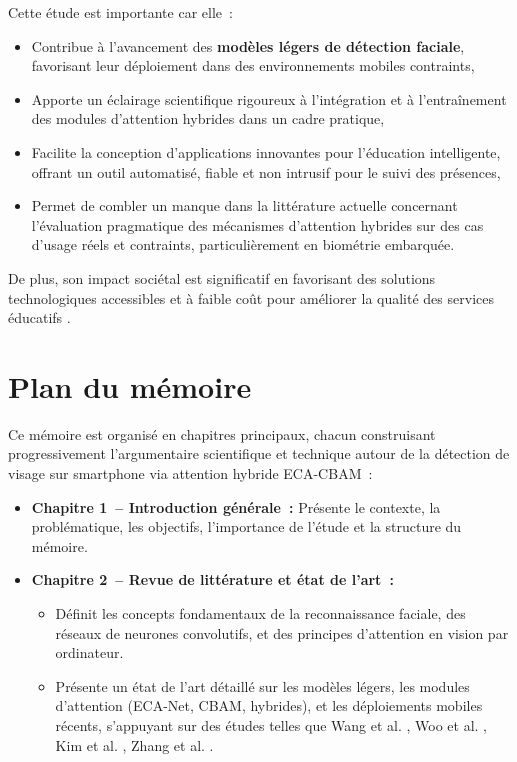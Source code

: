 \begin{onehalfspace}
\hspace{0.65 cm}Cette étude est importante car elle~:

\begin{itemize}
\item Contribue à l'avancement des \textbf{modèles légers de détection faciale}, favorisant leur déploiement dans des environnements mobiles contraints,
\item Apporte un éclairage scientifique rigoureux à l'intégration et à l'entraînement des modules d'attention hybrides dans un cadre pratique,
\item Facilite la conception d'applications innovantes pour l'éducation intelligente, offrant un outil automatisé, fiable et non intrusif pour le suivi des présences,
\item Permet de combler un manque dans la littérature actuelle concernant l'évaluation pragmatique des mécanismes d'attention hybrides sur des cas d'usage réels et contraints, particulièrement en biométrie embarquée.
\end{itemize}

\hspace{0.65 cm}De plus, son impact sociétal est significatif en favorisant des solutions technologiques accessibles et à faible coût pour améliorer la qualité des services éducatifs \cite{Kim2025FeatherFace, Wang2024ECACBAM}.

\section{Plan du mémoire}

\hspace{0.65 cm}Ce mémoire est organisé en chapitres principaux, chacun construisant progressivement l'argumentaire scientifique et technique autour de la détection de visage sur smartphone via attention hybride ECA-CBAM~:

\begin{itemize}
\item \textbf{Chapitre 1~– Introduction générale~:} Présente le contexte, la problématique, les objectifs, l'importance de l'étude et la structure du mémoire.

\item \textbf{Chapitre 2~– Revue de littérature et état de l'art~:}
\begin{itemize}
\item Définit les concepts fondamentaux de la reconnaissance faciale, des réseaux de neurones convolutifs, et des principes d'attention en vision par ordinateur.
\item Présente un état de l'art détaillé sur les modèles légers, les modules d'attention (ECA-Net, CBAM, hybrides), et les déploiements mobiles récents, s'appuyant sur des études telles que Wang et al. \cite{Wang2020ECANet, Wang2024ECACBAM}, Woo et al. \cite{Woo2018CBAM}, Kim et al. \cite{Kim2025FeatherFace}, Zhang et al. \cite{Zhang2019BlazeFace}.
\end{itemize}


\end{itemize}
\end{onehalfspace}
